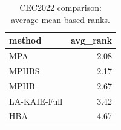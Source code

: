 \begin{table}[t]
\centering
\scriptsize
\caption{CEC2022 comparison: average mean-based ranks.}
\label{tab:cec2022_comparison_ranks}
\begin{tabular}{lr}
\toprule
method & avg\_rank \\
\midrule
MPA & 2.08 \\
MPHBS & 2.17 \\
MPHB & 2.67 \\
LA-KAIE-Full & 3.42 \\
HBA & 4.67 \\
\bottomrule
\end{tabular}
\end{table}
